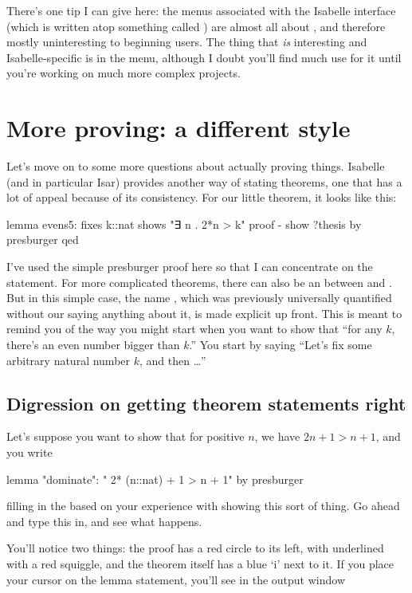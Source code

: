There's one tip I can give here: the menus associated with the Isabelle interface (which is written atop something called ) are almost all about , and therefore mostly uninteresting to beginning users. The thing that \textit{is} interesting and Isabelle-specific is in the  menu, although I doubt you'll find much use for it until you're working on much more complex projects.


\section{More proving: a different style}

Let's move on to some more questions about actually proving things. 
Isabelle (and in particular Isar) provides another way of stating theorems, one that has a lot of appeal because of its consistency. For our little  theorem, it looks like this:
\begin{IS}    
lemma evens5:
  fixes k::nat
  shows "∃ n . 2*n > k"
proof -
  show ?thesis by presburger
qed
\end{IS}

I've used the simple presburger proof here so that I can concentrate on the statement. For more complicated theorems, there can also be an  between  and . But in this simple case, the name , which was previously universally quantified without our saying anything about it, is made explicit up front. This is meant to remind you of the way you might start when you want to show that ``for any $k$, there's an even number bigger than $k$.'' You start by saying ``Let's fix some arbitrary natural number $k$, and then …'' 

\subsection*{Digression on getting theorem statements right}
Let's suppose you want to show that for positive $n$, we have $2n + 1 > n + 1$, and you write

\begin{IS}
lemma "dominate": " 2* (n::nat) + 1 > n + 1"
  by presburger    
\end{IS}
\noindent
filling in the  based on your experience with showing this sort of thing.  Go ahead and type this in, and see what happens. 

You'll notice two things: the proof has a red circle to its left, with   underlined with a red squiggle, and the theorem itself has a blue `i' next to it. If you place your cursor on the lemma statement, you'll see in the output window 

